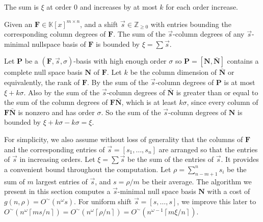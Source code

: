 \begin{pf}
The sum is $\xi$ at order 0 and increases by at most $k$ for each
order increase.\end{pf}
\begin{lem}
\label{lem:boundOfSumOfShiftedDegreesOfNullspaceBasis}Given an $\mathbf{F}\in\mathbb{K}\left[x\right]^{m\times n}$,
and a shift $\vec{s}\in\mathbb{Z}_{\ge0}$ with entries bounding the
corresponding column degrees of $\mathbf{F}$. The sum of the $\vec{s}$-column
degrees of any $\vec{s}$-minimal nullspace basis of $\mathbf{F}$
is bounded by $\xi=\sum\vec{s}$.\end{lem}
\begin{pf}
Let $\mathbf{P}$ be a $(\mathbf{F},\vec{s},\sigma)$-basis with high
enough order $\sigma$ so $\mathbf{P}=\left[\mathbf{N},\bar{\mathbf{N}}\right]$
contains a complete null space basis $\mathbf{N}$ of $\mathbf{F}$.
Let $k$ be the column dimension of $\bar{\mathbf{N}}$ or equivalently,
the rank of $\mathbf{F}$. By 
the sum of the $\vec{s}$-column degrees of $\mathbf{P}$ is at most
$\xi+k\sigma$. Also by  the sum
of the $\vec{s}$-column degrees of $\bar{\mathbf{N}}$ is greater
than or equal to the sum of the column degrees of $\mathbf{F}\bar{\mathbf{N}}$,
which is at least $k\sigma$, since every column of $\mathbf{F}\bar{\mathbf{N}}$
is nonzero and has order $\sigma$. So the sum of the $\vec{s}$-column
degrees of $\mathbf{N}$ is bounded by $\xi+k\sigma-k\sigma=\xi$.
\end{pf}
For simplicity, we also assume without loss of generality that the
columns of $\mathbf{F}$ and the corresponding entries of $\vec{s}=\left[s_{1},\dots,s_{n}\right]$
are arranged so that the entries of $\vec{s}$ in increasing orders.
Let $\xi=\sum\vec{s}$ be the sum of the entries of $\vec{s}$. It
provides a convenient bound throughout the computation. Let $\rho=\sum_{n-m+1}^{n}s_{i}$
be the sum of $m$ largest entries of $\vec{s}$, and $s=\rho/m$
be their average. The algorithm we present in this section computes
a $\vec{s}$-minimal null space basis $\mathbf{N}$ with a cost of
$g(n,\rho)=O^{\sim}(n^{\omega}s)$. For uniform shift $\vec{s}=\left[s,\dots,s\right]$,
we improve this later to $O^{\sim}\left(n^{\omega}\left\lceil ms/n\right\rceil \right)=O^{\sim}\left(n^{\omega}\left\lceil \rho/n\right\rceil \right)=O^{\sim}\left(n^{\omega-1}\left\lceil m\xi/n\right\rceil \right)$.
\begin{comment}
For general unbalanced shifts, the cost improvement requires the ability
to efficiently compute order basis with general shifts.
\end{comment}



